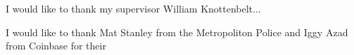 I would like to thank my supervisor William Knottenbelt...

I would like to thank Mat Stanley from the Metropoliton Police and Iggy Azad from Coinbase for their  
